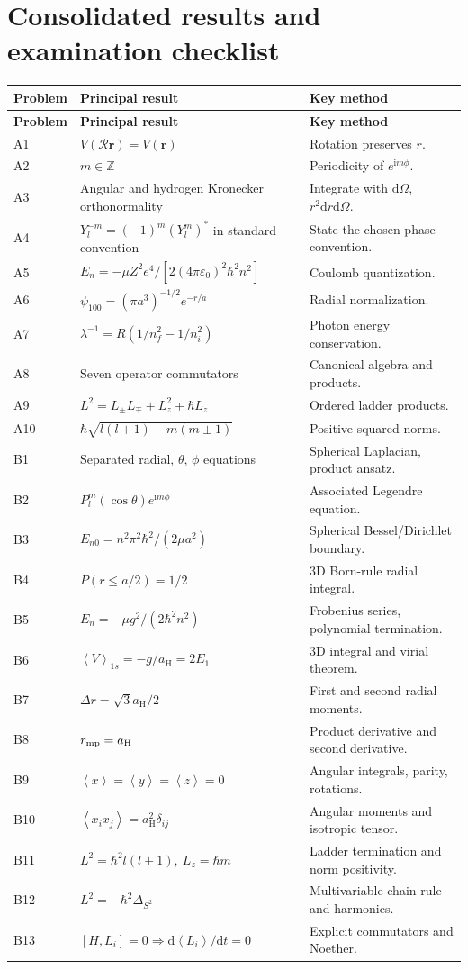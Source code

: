 \documentclass[11pt,a4paper]{article}
\newcommand{\dd}{\mathrm{d}}
\newcommand{\iu}{\mathrm{i}}
\newcommand{\avg}[1]{\left\langle #1\right\rangle}
\newcommand{\aH}{a_{\mathrm H}}
\newcommand{\eps}{\varepsilon_0}
\begin{document}
\clearpage
\section{Consolidated results and examination checklist}
\begin{longtable}{p{}p{}p{}}
\toprule
\textbf{Problem}&\textbf{Principal result}&\textbf{Key method}\tabularnewline\midrule\endfirsthead
\toprule\textbf{Problem}&\textbf{Principal result}&\textbf{Key method}\tabularnewline\midrule\endhead
A1 & \(V(\mathcal R\mathbf r)=V(\mathbf r)\) & Rotation preserves \(r\).\\
A2 & \(m\in\mathbb Z\) & Periodicity of \(e^{\iu m\phi}\).\\
A3 & Angular and hydrogen Kronecker orthonormality & Integrate with \(\dd\Omega\), \(r^2\dd r\dd\Omega\).\\
A4 & \(Y_l^{-m}=(-1)^m(Y_l^m)^*\) in standard convention & State the chosen phase convention.\\
A5 & \(E_n=-\mu Z^2e^4/[2(4\pi\eps)^2\hbar^2n^2]\) & Coulomb quantization.\\
A6 & \(\psi_{100}=(\pi a^3)^{-1/2}e^{-r/a}\) & Radial normalization.\\
A7 & \(\lambda^{-1}=R(1/n_f^2-1/n_i^2)\) & Photon energy conservation.\\
A8 & Seven operator commutators & Canonical algebra and products.\\
A9 & \(L^2=L_\pm L_\mp+L_z^2\mp\hbar L_z\) & Ordered ladder products.\\
A10 & \(\hbar\sqrt{l(l+1)-m(m\pm1)}\) & Positive squared norms.\\
B1 & Separated radial, \(\theta\), \(\phi\) equations & Spherical Laplacian, product ansatz.\\
B2 & \(P_l^m(\cos\theta)e^{\iu m\phi}\) & Associated Legendre equation.\\
B3 & \(E_{n0}=n^2\pi^2\hbar^2/(2\mu a^2)\) & Spherical Bessel/Dirichlet boundary.\\
B4 & \(P(r\le a/2)=1/2\) & 3D Born-rule radial integral.\\
B5 & \(E_n=-\mu g^2/(2\hbar^2n^2)\) & Frobenius series, polynomial termination.\\
B6 & \(\avg V_{1s}=-g/\aH=2E_1\) & 3D integral and virial theorem.\\
B7 & \(\Delta r=\sqrt3\aH/2\) & First and second radial moments.\\
B8 & \(r_{\rm mp}=\aH\) & Product derivative and second derivative.\\
B9 & \(\avg x=\avg y=\avg z=0\) & Angular integrals, parity, rotations.\\
B10 & \(\avg{x_i x_j}=\aH^2\delta_{ij}\) & Angular moments and isotropic tensor.\\
B11 & \(L^2=\hbar^2l(l+1),\ L_z=\hbar m\) & Ladder termination and norm positivity.\\
B12 & \(L^2=-\hbar^2\Delta_{S^2}\) & Multivariable chain rule and harmonics.\\
B13 & \([H,L_i]=0\Rightarrow\dd\avg{L_i}/\dd t=0\) & Explicit commutators and Noether.\\
\bottomrule
\end{longtable}
\end{document}
